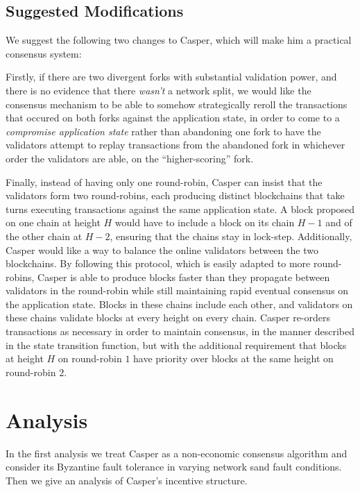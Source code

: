 \documentclass[11pt,a4paper]{article}
\begin{document}
\subsection{Suggested Modifications}

We suggest the following two changes to Casper, which will make him a practical consensus system:

Firstly, if there are two divergent forks with substantial validation power, and there is no evidence that there \emph{wasn't} a network split, we would like the consensus mechanism to be able to somehow strategically reroll the transactions that occured on both forks against the application state, in order to come to a \emph{compromise application state} rather than abandoning one fork to have the validators attempt to replay transactions from the abandoned fork in whichever order the validators are able, on the ``higher-scoring'' fork. 

Finally, instead of having only one round-robin, Casper can insist that the validators form two round-robins, each producing distinct blockchains that take turns executing transactions against the same application state. A block proposed on one chain at height $H$ would have to include a block on its chain $H-1$ and of the other chain at $H-2$, ensuring that the chains stay in lock-step. Additionally, Casper would like a way to balance the online validators between the two blockchains. By following this protocol, which is easily adapted to more round-robins, Casper is able to produce blocks faster than they propagate between validators in the round-robin while still maintaining rapid eventual consensus on the application state. Blocks in these chains include each other, and validators on these chains validate blocks at every height on every chain. Casper re-orders transactions as necessary in order to maintain consensus, in the manner described in the state transition function, but with the additional requirement that blocks at height $H$ on round-robin $1$ have priority over blocks at the same height on round-robin $2$.


\section{Analysis}

In the first analysis we treat Casper as a non-economic consensus algorithm and consider its Byzantine fault tolerance in varying network sand fault conditions. Then we give an analysis of Casper's incentive structure.
\end{document}
